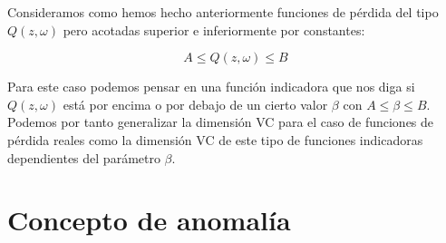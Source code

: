Consideramos como hemos hecho anteriormente funciones de pérdida del tipo $Q(z,\omega)$ pero acotadas superior e inferiormente por constantes:

$$A\leq Q(z,\omega) \leq B$$

Para este caso podemos pensar en una función indicadora que nos diga si $Q(z,\omega)$ está por encima o por debajo de un cierto valor $\beta$ con $A\leq \beta \leq B$. Podemos por tanto generalizar la dimensión VC para el caso de funciones de pérdida reales como la dimensión VC de este tipo de funciones indicadoras dependientes del parámetro $\beta$.

\chapter{Concepto de anomalía}
\label{chapter:anomalia}